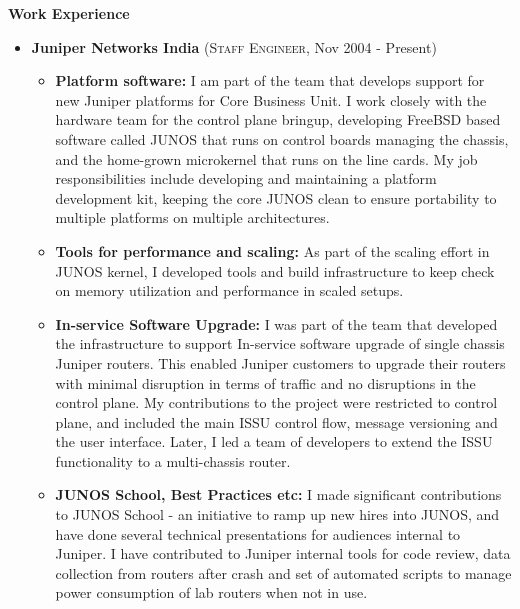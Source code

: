 \documentclass[11pt]{article}
\newcommand{\resitem}[2]{\item \textbf{#1:} #2}
\newcommand{\resheading}[1]{{\large \colorbox{mygrey}{\begin{minipage}{\textwidth}{\textbf{#1 \vphantom{p\^{E}}}}\end{minipage}}}}
\newcommand{\ressubheading}[3]{\item \textbf{#1} (\textsc{#2}, #3) }
\begin{document}
\vspace{0.1in}
\resheading{Work Experience}
\begin{itemize}
  \ressubheading{Juniper Networks India}{Staff Engineer}{Nov 2004 - Present}
    \begin{itemize}

    \resitem{Platform software}{I am part of the team that develops support for
    new Juniper platforms for Core Business Unit. I work closely with the
    hardware team for the control plane bringup, developing FreeBSD based
    software called JUNOS that runs on control boards managing the chassis, and
    the home-grown microkernel that runs on the line cards. My job
    responsibilities include developing and maintaining a platform development
    kit, keeping the core JUNOS clean to ensure portability to multiple
    platforms on multiple architectures.}

    \resitem{Tools for performance and scaling}{As part of the scaling effort
    in JUNOS kernel, I developed tools and build infrastructure to keep check
    on memory utilization and performance in scaled setups.}

    \resitem{In-service Software Upgrade}{I was part of the team that developed
    the infrastructure to support In-service software upgrade of single chassis
    Juniper routers. This enabled Juniper customers to upgrade their routers
    with minimal disruption in terms of traffic and no disruptions in the
    control plane. My contributions to the project were restricted to control
    plane, and included the main ISSU control flow, message versioning and the
    user interface. Later, I led a team of developers to extend the ISSU
    functionality to a multi-chassis router.}

    \resitem{JUNOS School, Best Practices etc}{I made significant contributions
    to JUNOS School - an initiative to ramp up new hires into JUNOS, and have
    done several technical presentations for audiences internal to Juniper. I
    have contributed to Juniper internal tools for code review, data collection
    from routers after crash and set of automated scripts to manage power
    consumption of lab routers when not in use.}

    \end{itemize}


\end{itemize}
\end{document}
